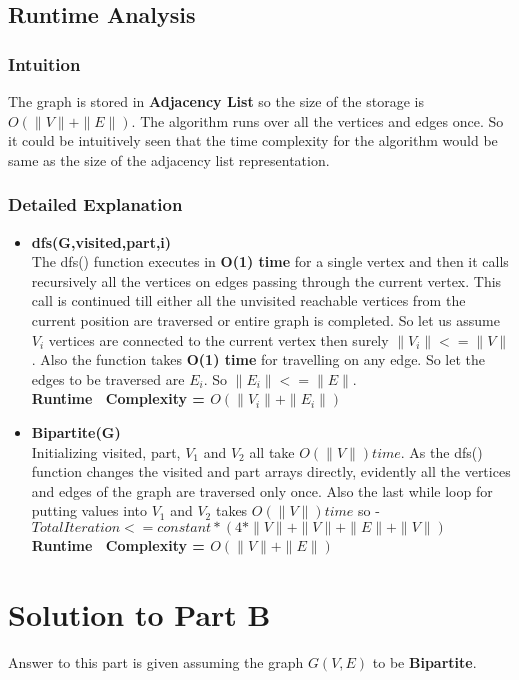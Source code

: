 \documentclass[20pt]{article}
\begin{document}
\newpage
\subsection{Runtime Analysis}
\subsubsection{Intuition}
The graph is stored in \textbf{Adjacency List} so the size of the storage is \\ 
\textbf{$O(\|V\|+\|E\|)$}. The algorithm runs over all the vertices and edges once. So it could be intuitively seen that the time complexity for the algorithm would be same as the size of the adjacency list representation.
\subsubsection{Detailed Explanation}
\begin{itemize}
\item \textbf{dfs(G,visited,part,i)} \\
The dfs() function executes in \textbf{O(1) time} for a single vertex and then it calls recursively all the vertices on edges passing through the current vertex. This call is continued till either all the unvisited reachable vertices from the current position are traversed or entire graph is completed. So let us assume $V_i$ vertices are connected to the current vertex then surely $\|V_i\|<=\|V\|$. Also the function takes \textbf{O(1) time} for travelling on any edge. So let the edges to be traversed are $E_i$. So $\|E_i\|<=\|E\|$. \\
\textbf{Runtime ~Complexity = $O(\|V_i\|+\|E_i\|)$}
\item \textbf{Bipartite(G)} \\
Initializing visited, part, $V_1$ and $V_2$ all take \textbf{$O(\|V\|) time$}. As the dfs() function changes the visited and part arrays directly, evidently all the vertices and edges of the graph are traversed only once. Also the last while loop for putting values into $V_1$ and $V_2$ takes \textbf{$O(\|V\|) time$} so - \\
$Total Iteration <= constant*(4*\|V\|+\|V\|+\|E\|+\|V\|)$ \\
\textbf{Runtime ~Complexity = $O(\|V\|+\|E\|)$}
\end{itemize}

\newpage
\section{Solution to Part B}
Answer to this part is given assuming the graph $G(V,E)$ to be \textbf{Bipartite}.
\end{document}

